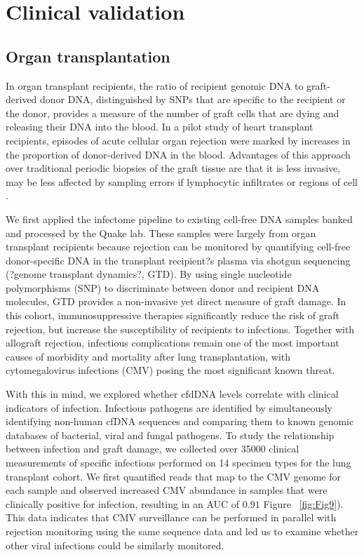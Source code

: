 \chapter{Clinical validation}
 
\section{Organ transplantation}
 
In organ transplant recipients, the ratio of recipient genomic DNA to graft-derived donor DNA, distinguished by SNPs that are specific to the recipient or the donor, provides a measure of the number of graft cells that are dying and releasing their DNA into the blood. In a pilot study of heart transplant recipients, episodes of acute cellular organ rejection were marked by increases in the proportion of donor-derived DNA in the blood. Advantages of this approach over traditional periodic biopsies of the graft tissue are that it is less invasive, may be less affected by sampling errors if lymphocytic infiltrates or regions of cell \cite{Snyder:2011gd}.
   
We first applied the infectome pipeline to existing cell-free DNA samples banked and processed by the Quake lab. These samples were largely from organ transplant recipients because rejection can be monitored by quantifying cell-free donor-specific DNA in the transplant recipient?s plasma via shotgun sequencing (?genome transplant dynamics?, GTD). By using single nucleotide polymorphisms (SNP) to discriminate between donor and recipient DNA molecules, GTD provides a non-invasive yet direct measure of graft damage. In this cohort, immunosuppressive therapies significantly reduce the risk of graft rejection, but increase the susceptibility of recipients to infections. Together with allograft rejection, infectious complications remain one of the most important causes of morbidity and mortality after lung transplantation, with cytomegalovirus infections (CMV) posing the most significant known threat. 

With this in mind, we explored whether cfdDNA levels correlate with clinical indicators of infection. Infectious pathogens are identified by simultaneously identifying non-human cfDNA sequences and comparing them to known genomic databases of bacterial, viral and fungal pathogens. To study the relationship between infection and graft damage, we collected over 35000 clinical measurements of specific infections performed on 14 specimen types for the lung transplant cohort. We first quantified reads that map to the CMV genome for each sample and observed increased CMV abundance in samples that were clinically positive for infection, resulting in an AUC of $0.91$ Figure ~\ref{fig:Fig9}). This data indicates that CMV surveillance can be performed in parallel with rejection monitoring using the same sequence data and led us to examine whether other viral infections could be similarly monitored.

